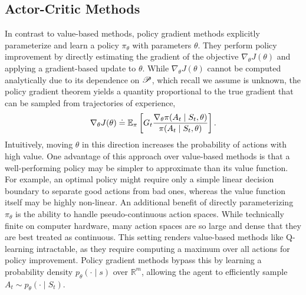 \FloatBarrier
\subsection{Actor-Critic Methods}
In contrast to value-based methods, policy gradient methods explicitly parameterize and learn a policy $\pi_\theta$ with parameters $\theta$. They perform policy improvement by directly estimating the gradient of the objective $\nabla_\theta J(\theta)$ and applying a gradient-based update to $\theta$. While $\nabla_\theta J(\theta)$ cannot be computed analytically due to its dependence on $\mathscr{P}$, which recall we assume is unknown, the policy gradient theorem  yields a quantity proportional to the true gradient that can be sampled from trajectories of experience,
\begin{equation}
    \nabla_\theta J(\theta) \doteq \operatorname{\mathbb{E}}_\pi \left[ G_t \frac{\nabla_\theta \pi(A_t \mid S_t, \theta)}{\pi(A_t \mid S_t, \theta)} \right].
    \label{eq:pg}
\end{equation}
Intuitively, moving $\theta$ in this direction increases the probability of actions with high value. One advantage of this approach over value-based methods is that a well-performing policy may be simpler to approximate than its value function. For example, an optimal policy might require only a simple linear decision boundary to separate good actions from bad ones, whereas the value function itself may be highly non-linear. An additional benefit of directly parameterizing $\pi_\theta$ is the ability to handle pseudo-continuous action spaces. While technically finite on computer hardware, many action spaces are so large and dense that they are best treated as continuous. This setting renders value-based methods like Q-learning intractable, as they require computing a maximum over all actions for policy improvement. Policy gradient methods bypass this by learning a probability density $p_\theta(\cdot \mid s)$ over $\mathbb{R}^m$, allowing the agent to efficiently sample $A_t \sim p_\theta(\cdot \mid S_t)$.

